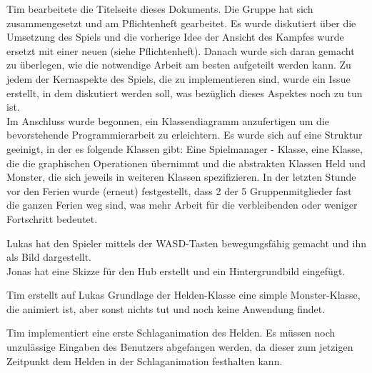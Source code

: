 
Tim bearbeitete die Titelseite dieses Dokuments. Die Gruppe hat sich zusammengesetzt und am Pflichtenheft gearbeitet. Es wurde diskutiert über die Umsetzung des Spiels und die vorherige Idee der Ansicht des Kampfes wurde ersetzt mit einer neuen (siehe Pflichtenheft). Danach wurde sich daran gemacht zu überlegen, wie die notwendige Arbeit am besten aufgeteilt werden kann. Zu jedem der Kernaspekte des Spiels, die zu implementieren sind, wurde ein \glqq{}Issue\grqq{} erstellt, in dem diskutiert werden soll, was bezüglich dieses Aspektes noch zu tun ist.\\
Im Anschluss wurde begonnen, ein Klassendiagramm anzufertigen um die bevorstehende Programmierarbeit zu erleichtern. Es wurde sich auf eine Struktur geeinigt, in der es folgende Klassen gibt: Eine \glqq{}Spielmanager\grqq{} - Klasse, eine Klasse, die die graphischen Operationen übernimmt und die abstrakten Klassen Held und Monster, die sich jeweils in weiteren Klassen spezifizieren. In der letzten Stunde vor den Ferien wurde (erneut) festgestellt, dass 2 der 5 Gruppenmitglieder fast die ganzen Ferien weg sind, was mehr Arbeit für die verbleibenden oder weniger Fortschritt bedeutet. \\


Lukas hat den Spieler mittels der WASD-Tasten bewegungsfähig gemacht und ihn als Bild dargestellt. \\
Jonas hat eine Skizze für den Hub erstellt und ein Hintergrundbild eingefügt. \\


Tim erstellt auf Lukas Grundlage der Helden-Klasse eine simple Monster-Klasse, die animiert ist, aber sonst nichts tut und noch keine Anwendung findet. \\


Tim implementiert eine erste Schlaganimation des Helden. Es müssen noch \glqq{}unzulässige Eingaben\grqq{} des Benutzers abgefangen werden, da dieser zum jetzigen Zeitpunkt dem Helden in der Schlaganimation festhalten kann. \\


